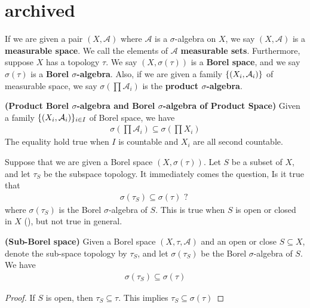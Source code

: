 \documentclass{report}
\begin{document}
\section{archived}
\begin{mdframed}
If we are given a pair $(X,\mathcal{A})$ where $\mathcal{A}$ is a $\sigma$-algebra on $X$, we say $(X,\mathcal{A})$ is a \textbf{measurable space}. We call the elements of $\mathcal{A}$ \textbf{measurable sets}. Furthermore, suppose $X$ has a topology $\tau$. We say $(X,\sigma (\tau))$ is a \textbf{Borel space}, and we say $\sigma (\tau)$ is a \textbf{Borel $\sigma$-algebra}. Also, if we are given a family $\{ (X_i ,\mathcal{A}_i) \}$ of measurable space, we say $\sigma (\prod \mathcal{A}_i)$ is the \textbf{product $\sigma$-algebra}.
\end{mdframed}
\begin{theorem}
\textbf{(Product Borel $\sigma$-algebra and Borel $\sigma$-algebra of Product Space)} Given a family $\{ (X_i , \mathcal{A}_i) \}_{i \in I}$ of Borel space, we have 
\begin{align*}
\sigma (\prod \mathcal{A}_i) \subseteq \sigma (\prod X_i)
\end{align*}
The equality hold true when $I$ is countable and $X_i$ are all second countable. 
\end{theorem}
\begin{mdframed}
Suppose that we are given a Borel space $(X,\sigma (\tau))$. Let $S$ be a subset of  $X$, and let  $\tau_S$ be the subspace topology. It immediately comes the question, Is it true that 
\begin{align*}
\sigma (\tau_S)\subseteq \sigma (\tau)\text{ ? }
\end{align*}
where $\sigma (\tau_S)$ is the Borel $\sigma$-algebra of $S$. This is true when $S$ is open or closed in  $X$ (), but not true in general.  
\end{mdframed}
\begin{theorem}
\label{SBs}
\textbf{(Sub-Borel space)} Given a Borel space $(X,\tau,\mathcal{A})$ and an open or close $S \subseteq X$, denote the sub-space topology by  $\tau_S$, and let $\sigma (\tau_S)$ be the Borel $\sigma$-algebra of $S$.  We have
\begin{align*}
\sigma (\tau_S)\subseteq \sigma (\tau)
\end{align*}
\end{theorem}
\begin{proof}
If $S$ is open, then $\tau_S \subseteq \tau$. This implies $\tau_S \subseteq \sigma (\tau)$
\end{proof}
\end{document}
